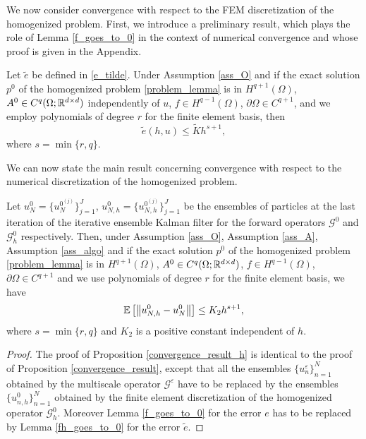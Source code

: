 \documentclass[10pt]{article}
\begin{document}
We now consider convergence with respect to the FEM discretization of the homogenized problem. First, we introduce a preliminary result, which plays the role of Lemma \ref{f_goes_to_0} in the context of numerical convergence and whose proof is given in the Appendix.
\begin{lemma}
	\label{fh_goes_to_0}
	Let $\tilde{e}$ be defined in \eqref{e_tilde}. Under Assumption \ref{ass_O} and if the exact solution $p^0$ of the homogenized problem \eqref{problem_lemma} is in $H^{q+1}(\Omega)$, $A^0 \in C^q(\Omega;\mathbb{R}^{d \times d})$ independently of $u$, $f \in H^{q-1}(\Omega)$, $\partial \Omega \in C^{q+1}$, and we employ polynomials of degree $r$ for the finite element basis, then
	\[ \tilde{e}(h, u) \le \tilde{K} h^{s+1}, \]
	where $s = \min \{ r, q \}$.
\end{lemma}
We can now state the main result concerning convergence with respect to the numerical discretization of the homogenized problem.
\begin{proposition}
\label{convergence_result_h}
Let $u_{N}^0 = \{ u_{N}^{0^{(j)}} \}_{j=1}^J$, $u_{N,h}^0 = \{ u_{N,h}^{0^{(j)}} \}_{j=1}^J$ be the ensembles of particles at the last iteration of the iterative ensemble Kalman filter for the forward operators $\mathcal{G}^0$ and $\mathcal{G}_h^0$ respectively. Then, under Assumption \ref{ass_O}, Assumption \ref{ass_A}, Assumption \ref{ass_algo} and if the exact solution $p^0$ of the homogenized problem \eqref{problem_lemma} is in $H^{q+1}(\Omega)$, $A^0 \in C^q(\Omega;\mathbb{R}^{d \times d})$, $f \in H^{q-1}(\Omega)$, $\partial \Omega \in C^{q+1}$ and we use polynomials of degree $r$ for the finite element basis, we have
\[ \mathbb{E} \left [ \left\|u_{N,h}^0 - u_N^0\right\| \right ] \le K_2 h^{s+1}, \]
where $s = \min \{ r, q \}$ and $K_2$ is a positive constant independent of $h$.
\end{proposition}
\begin{proof}
The proof of Proposition \ref{convergence_result_h} is identical to the proof of Proposition \ref{convergence_result}, except that all the ensembles $\{ u_n^{\varepsilon} \}_{n=1}^N$ obtained by the multiscale operator $\mathcal{G}^{\varepsilon}$ have to be replaced by the ensembles $\{ u_{n,h}^0 \}_{n=1}^N$ obtained by the finite element discretization of the homogenized operator $\mathcal{G}^0_h$. Moreover Lemma \ref{f_goes_to_0} for the error $e$ has to be replaced by Lemma \ref{fh_goes_to_0} for the error $\tilde{e}$.
\end{proof}
\end{document}
